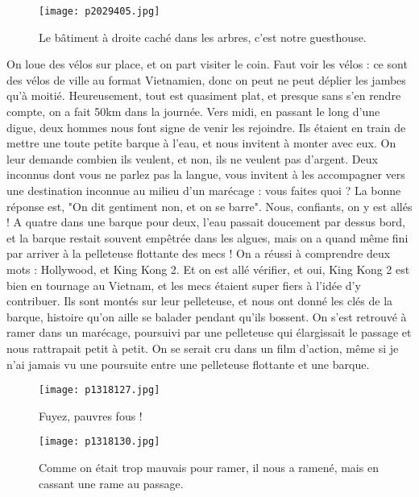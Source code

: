 \documentclass{book}
\begin{document}
\begin{figure}[h]
\centering
\texttt{[image: p2029405.jpg]}
\caption*{Le bâtiment à droite caché dans les arbres, c'est notre guesthouse.}
\end{figure}

On loue des vélos sur place, et on part visiter le coin. Faut voir les vélos : ce sont des vélos de ville au format Vietnamien, donc on peut ne peut déplier les jambes qu'à moitié. Heureusement, tout est quasiment plat, et presque sans s'en rendre compte, on a fait 50km dans la journée. Vers midi, en passant le long d'une digue, deux hommes nous font signe de venir les rejoindre. Ils étaient en train de mettre une toute petite barque à l'eau, et nous invitent à monter avec eux. On leur demande combien ils veulent, et non, ils ne veulent pas d'argent. Deux inconnus dont vous ne parlez pas la langue, vous invitent à les accompagner vers une destination inconnue au milieu d'un marécage : vous faites quoi ? La bonne réponse est, "On dit gentiment non, et on se barre". Nous, confiants, on y est allés ! A quatre dans une barque pour deux, l'eau passait doucement par dessus bord, et la barque restait souvent empêtrée dans les algues, mais on a quand même fini par arriver à la pelleteuse flottante des mecs ! On a réussi à comprendre deux mots : Hollywood, et King Kong 2. Et on est allé vérifier, et oui, King Kong 2 est bien en tournage au Vietnam, et les mecs étaient super fiers à l'idée d'y contribuer. Ils sont montés sur leur pelleteuse, et nous ont donné les clés de la barque, histoire qu'on aille se balader pendant qu'ils bossent. On s'est retrouvé à ramer dans un marécage, poursuivi par une pelleteuse qui élargissait le passage et nous rattrapait petit à petit. On se serait cru dans un film d'action, même si je n'ai jamais vu une poursuite entre une pelleteuse flottante et une barque.


\begin{figure}[h]
\centering
\texttt{[image: p1318127.jpg]}
\caption*{Fuyez, pauvres fous !}
\end{figure}


\begin{figure}[h]
\centering
\texttt{[image: p1318130.jpg]}
\caption*{Comme on était trop mauvais pour ramer, il nous a ramené, mais en cassant une rame au passage.}
\end{figure}
\end{document}
